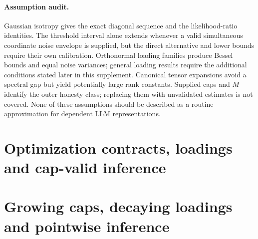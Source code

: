 \documentclass[11pt]{article}
\theoremstyle{remark}
\begin{document}
\paragraph{Assumption audit.}
Gaussian isotropy gives the exact diagonal sequence and the likelihood-ratio identities. The threshold interval alone extends whenever a valid simultaneous coordinate noise envelope is supplied, but the direct alternative and lower bounds require their own calibration. Orthonormal loading families produce Bessel bounds and equal noise variances; general loading results require the additional conditions stated later in this supplement. Canonical tensor expansions avoid a spectral gap but yield potentially large rank constants. Supplied caps and $M$ identify the outer honesty class; replacing them with unvalidated estimates is not covered. None of these assumptions should be described as a routine approximation for dependent LLM representations.

\appendix







\section{Optimization contracts, loadings and cap-valid inference}


\section{Growing caps, decaying loadings and pointwise inference}





\end{document}
